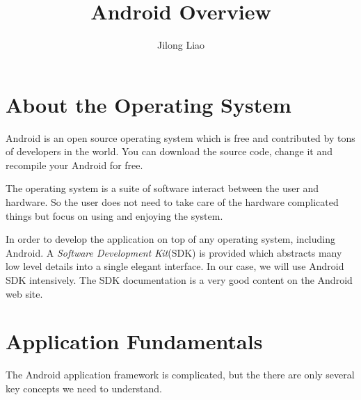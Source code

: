 \documentclass[10pt, letterpaper]{article}
\begin{document}
\title{Android Overview}
\author{Jilong Liao}
\maketitle

\section{About the Operating System}
Android is an open source operating system which is free and contributed by tons of developers in the world. You can download the source code, change it and recompile your Android for free.

The operating system is a suite of software interact between the user and hardware. So the user does not need to take care of the hardware complicated things but focus on using and enjoying the system.

In order to develop the application on top of any operating system, including Android. A \emph{Software Development Kit}(SDK) is provided which abstracts many low level details into a single elegant interface. In our case, we will use Android SDK intensively. The SDK documentation is a very good content on the Android web site.

\section{Application Fundamentals}
The Android application framework is complicated, but the there are only several key concepts we need to understand. 
\end{document}
